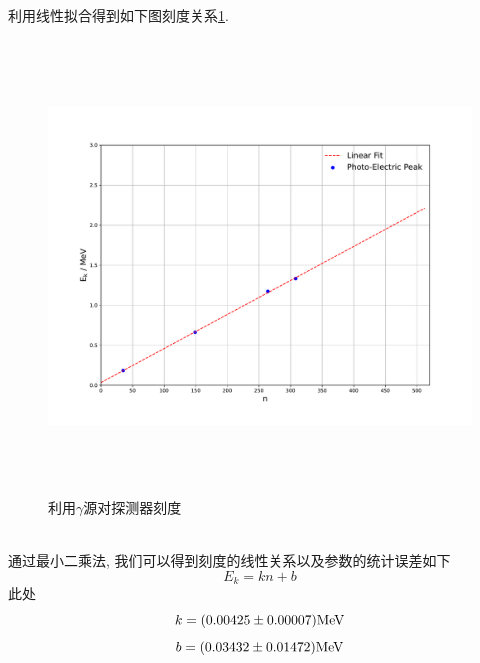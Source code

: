 \documentclass[a4paper]{article}
\begin{document}
\newpage
利用线性拟合得到如下图刻度关系\ref{fig:fig5}. 
\begin{figure}[ht]
 \centering
 \includegraphics[height=12cm, width=16cm]{images/phyex3_fig2.pdf}
 \caption{利用$\gamma$源对探测器刻度}
 \label{fig:fig5}
\end{figure}\\
通过最小二乘法, 我们可以得到刻度的线性关系以及参数的统计误差如下
\begin{equation}
    E_k=kn+b
\end{equation}
此处
\begin{equation}
k=(0.00425\pm0.00007)\rm MeV
\end{equation}
\begin{equation}
b=(0.03432\pm0.01472)\rm MeV
\end{equation}

\newpage
\end{document}
